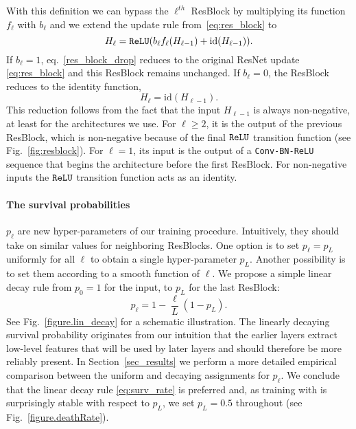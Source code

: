 \documentclass[runningheads]{llncs}
\begin{document}
With this definition we can bypass the $\ell^{th}$ ResBlock by multiplying its function $f_\ell$ with $b_\ell$ and we extend the update rule from~\eqref{eq:res_block} to
\begin{equation}
\label{res_block_drop}
 H_\ell = {\tt ReLU} (b_\ell f_\ell(H_{\ell-1}) +  \text{id}(H_{\ell-1})).
\end{equation}
If $b_\ell\!=\!1$, eq.~\eqref{res_block_drop} reduces to the original ResNet update \eqref{eq:res_block} and this ResBlock remains unchanged.
If $b_\ell\!=\!0$, the ResBlock reduces to the identity function,
\begin{equation}
 H_\ell = \text{id}(H_{\ell-1}).
\end{equation}
This reduction follows from the fact that the input $H_{\ell-1}$ is always non-negative, at least for the architectures we use. For $\ell\geq 2$, it is the output of the previous ResBlock, which is non-negative because of the final ${\tt ReLU}$ transition function (see Fig.~\ref{fig:resblock}). For $\ell\!=\!1$, its input is the output of a {\tt Conv-BN-ReLU} sequence that begins the architecture before the first ResBlock. For non-negative inputs the ${\tt ReLU}$ transition function acts as an identity.

\paragraph{\textbf{The survival probabilities}} $p_\ell$ are new hyper-parameters of our training procedure. Intuitively, they should take on similar values for neighboring ResBlocks. One option is to set $p_\ell=p_L$ uniformly for all $\ell$ to obtain a single hyper-parameter $p_L$. Another possibility is to set them according to a smooth function of $\ell$. We propose a simple linear decay rule from $p_0=1$ for the input, to $p_L$ for the last ResBlock:
\begin{equation}
\label{eq:surv_rate}
 p_\ell = 1-\frac{\ell}{L}(1-p_L).
\end{equation}
See Fig.~\ref{figure.lin_decay} for a schematic illustration.
The linearly decaying survival probability originates from our intuition that the earlier layers extract low-level features that will be used by later layers and should therefore be more reliably present.
In Section~\ref{sec_results} we perform a more detailed empirical comparison between the uniform and decaying assignments for $p_\ell$.  We conclude that the linear decay rule \eqref{eq:surv_rate} is preferred and, as training with \name{} is surprisingly stable with respect to $p_L$, we set $p_L=0.5$ throughout (see Fig.~\ref{figure.deathRate}).
\end{document}
